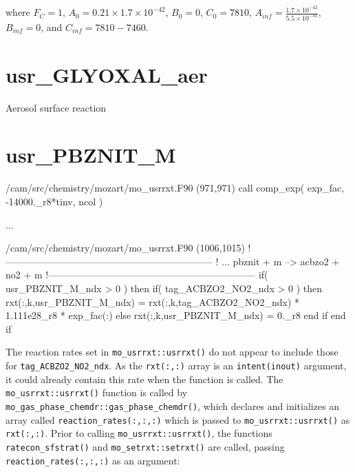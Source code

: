 \documentclass[titlepage]{article}
\begin{document}
\noindent where $F_C = 1$, $A_0 = 0.21 \times 1.7 \times 10^{-42}$, $B_0 = 0$, $C_0 = 7810$, $A_{inf} = \frac{1.7 \times 10^{-42}}{5.5 \times 10^{-31}}$, $B_{inf} = 0$, and $C_{inf} = 7810-7460$.


\section{usr\_GLYOXAL\_aer}

Aerosol surface reaction


\section{usr\_PBZNIT\_M}

\begin{blockcode}[commandchars=\\\{\}]
\color{gray}/cam/src/chemistry/mozart/mo_usrrxt.F90 (971,971)
       call comp_exp( exp_fac, -14000._r8*tinv, ncol )

\color{gray}...

\color{gray}/cam/src/chemistry/mozart/mo_usrrxt.F90 (1006,1015)
!-----------------------------------------------------------------
!       ... pbznit + m --> acbzo2 + no2 + m
!-----------------------------------------------------------------
       if( usr_PBZNIT_M_ndx > 0 ) then
          if( tag_ACBZO2_NO2_ndx > 0 ) then
             rxt(:,k,usr_PBZNIT_M_ndx) = rxt(:,k,tag_ACBZO2_NO2_ndx) * 1.111e28_r8 * exp_fac(:)
          else
             rxt(:,k,usr_PBZNIT_M_ndx) = 0._r8
          end if
       end if
\end{blockcode}

The reaction rates set in \verb>mo_usrrxt::usrrxt()> do not appear to include those for \verb>tag_ACBZO2_NO2_ndx>. As the \verb>rxt(:,:)> array is an \verb>intent(inout)> argument, it could already contain this rate when the function is called. The \verb>mo_usrrxt::usrrxt()> function is called by \verb>mo_gas_phase_chemdr::gas_phase_chemdr()>, which declares and initializes an array called \verb>reaction_rates(:,:,:)> which is passed to \verb>mo_usrrxt::usrrxt()> as \verb>rxt(:,:)>. Prior to calling \verb>mo_usrrxt::usrrxt()>, the functions \verb>ratecon_sfstrat()> and \verb>mo_setrxt::setrxt()> are called, passing \verb>reaction_rates(:,:,:)> as an argument:
\end{document}
